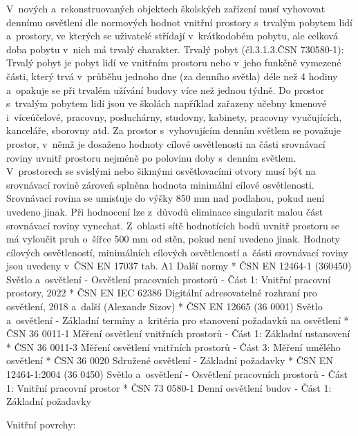 V~nových a~rekonstruovaných objektech školských zařízení musí vyhovovat dennímu osvětlení dle normových
hodnot vnitřní prostory s~trvalým pobytem lidí a~prostory, ve kterých se uživatelé střídají v~krátkodobém pobytu,
ale celková doba pobytu v~nich má trvalý charakter.
Trvalý pobyt (čl.3.1.3.ČSN 730580-1):
\medskip
Trvalý pobyt je pobyt lidí ve vnitřním prostoru nebo v~jeho funkčně vymezené části, který trvá v~průběhu jednoho
dne (za denního světla) déle než 4 hodiny a~opakuje se při trvalém užívání budovy více než jednou týdně.
\medskip
Do prostor s~trvalým pobytem lidí jsou ve školách například zařazeny učebny kmenové i~víceúčelové, pracovny,
posluchárny, studovny, kabinety, pracovny vyučujících, kanceláře, sborovny atd. Za prostor s~vyhovujícím
denním světlem se považuje prostor, v~němž je dosaženo hodnoty cílové osvětlenosti na části srovnávací
roviny uvnitř prostoru nejméně po polovinu doby s~denním světlem.
\medskip
V~prostorech se svislými nebo šikmými osvětlovacími otvory musí být na srovnávací rovině zároveň splněna
hodnota minimální cílové osvětlenosti.
\medskip
Srovnávací rovina se umisťuje do výšky 850 mm nad podlahou, pokud není uvedeno jinak. Při hodnocení lze z~důvodů
eliminace singularit malou část srovnávací roviny vynechat. Z~oblasti sítě hodnotících bodů uvnitř prostoru se
má vyloučit pruh o~šířce 500 mm od stěn, pokud není uvedeno jinak.
\medskip
Hodnoty cílových osvětleností, minimálních cílových osvětleností a~části srovnávací roviny jsou uvedeny v~ČSN EN 17037 tab. A1
\medskip
{\sbf Další normy}
\begitems
    * ČSN EN 12464-1 (360450) Světlo a~osvětlení - Osvětlení pracovních prostorů - Část 1: Vnitřní pracovní prostory, 2022
    * ČSN EN IEC 62386 Digitální adresovatelné rozhraní pro osvětlení, 2018
      a~další (Alexandr Sizov)
    * ČSN EN 12665 (36 0001) Světlo a~osvětlení - Základní termíny a~kritéria pro stanovení požadavků na osvětlení
    * ČSN 36 0011-1 Měření osvětlení vnitřních prostorů - Část 1: Základní ustanovení
    * ČSN 36 0011-3 Měření osvětlení vnitřních prostorů - Část 3: Měření umělého osvětlení
    * ČSN 36 0020 Sdružené osvětlení - Základní požadavky
    * ČSN EN 12464-1:2004 (36 0450) Světlo a~osvětlení - Osvětlení pracovních prostorů - Část 1: Vnitřní pracovní prostor
    * ČSN 73 0580-1 Denní osvětlení budov - Část 1: Základní požadavky
\enditems

{\sbf Vnitřní povrchy:}

